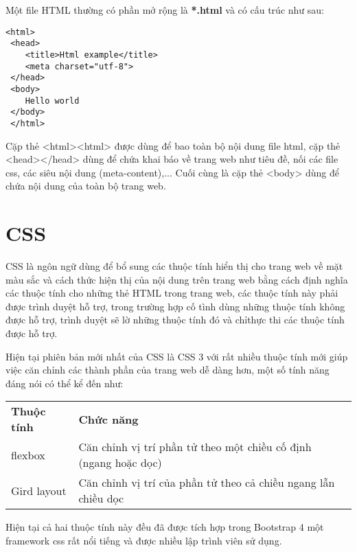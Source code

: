 Một file HTML thường có phần mở rộng là \textbf{*.html} và có cấu trúc như sau:
\lstset{language=Html}
\begin{center}
\begin{lstlisting}[frame=single]
 <html>
 <head>
    <title>Html example</title>
    <meta charset="utf-8">
 </head>
 <body>
    Hello world
 </body>
 </html>
\end{lstlisting}
\end{center}
Cặp thẻ <html><html> được dùng để bao toàn bộ nội dung file html, cặp thẻ <head></head> dùng để chứa khai báo về trang web như tiêu đề, nối các file css, các siêu nội dung (meta-content),... Cuối cùng là cặp thẻ <body> dùng để chứa nội dung của toàn bộ trang web.
\section{CSS}
CSS là ngôn ngữ dùng để bổ sung các thuộc tính hiển thị cho trang web về mặt màu sắc và cách thức hiện thị của nội dung trên trang web bằng cách định nghĩa các thuộc tính cho những thẻ HTML trong trang web, các thuộc tính này phải được trình duyệt hỗ trợ, trong trường hợp cố tình dùng những thuộc tính không được hỗ trợ, trình duyệt sẽ lờ những thuộc tính đó và chỉthực thi các thuộc tính được hỗ trợ.\par
Hiện tại phiên bản mới nhất của CSS là CSS 3 với rất nhiều thuộc tính mới giúp việc căn chỉnh các thành phần của trang web dễ dàng hơn, một số tính năng đáng nói có thể kể đến như:

\begin{table}[h!]
\centering
\begin{tabular}{|l|l|}
    \cline{1-2}
    \textbf{Thuộc tính} & \textbf{Chức năng}\\ \cline{1-2} 
    flexbox & Căn chỉnh vị trí phần tử theo một chiều cố định (ngang hoặc dọc)\\ \cline{1-2}
    Gird layout & Căn chỉnh vị trí của phần tử theo cả chiều ngang lẫn chiều dọc\\ \cline{1-2}
\end{tabular}
\end{table}

Hiện tại cả hai thuộc tính này đều đã được tích hợp trong Bootstrap 4 một framework css rất nổi tiếng và được nhiều lập trình viên sử dụng.
